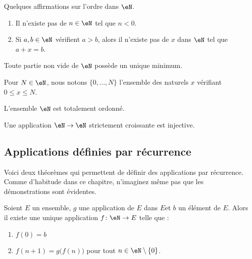 \begin{lemma}       \label{LEMooYMRJooYIAhBb}
    Quelques affirmations sur l'ordre dans \( \eN\).
    \begin{enumerate}
        \item
            Il n'existe pas de \( n\in \eN\) tel que \( n<0\).
        \item
            Si \( a,b\in \eN\) vérifient \( a>b\), alors il n'existe pas de \( x\) dans \( \eN\) tel que \( a+x=b\).
    \end{enumerate}
\end{lemma}

\begin{lemma}       \label{LEMooFHEOooSHPGgU}
    Toute partie non vide de \( \eN\) possède un unique minimum.
\end{lemma}

\begin{definition}      \label{DEFooKBUFooLvMHrf}
    Pour \( N\in \eN\), nous notons \( \{ 0,\ldots, N \}\) l'ensemble des naturels \( x\) vérifiant \( 0\leq x\leq N\).
\end{definition}

\begin{proposition}
    L'ensemble \( \eN\) est totalement ordonné.
\end{proposition}

\begin{proposition}     \label{PROPooFYMJooWihvhk}
    Une application \( \eN\to \eN\) strictement croissante est injective.
\end{proposition}

\subsection{Applications définies par récurrence}

Voici deux théorèmes qui permettent de définir des applications par récurrence. Comme d'habitude dans ce chapitre, n'imaginez même pas que les démonstrations sont évidentes.

\begin{theorem}       \label{THOooEJPYooZFVnez}
    Soient $E$ un ensemble, $g$ une application de $E$ dans $E $et $b$ un élément de $E$.  Alors il existe une unique application \( f\colon \eN\to E\) telle que :
    \begin{enumerate}
        \item
            \( f(0)=b\)
        \item
            \( f(n+1)=g\big( f(n) \big)\) pour tout \( n\in \eN\setminus\{ 0 \}\).
    \end{enumerate}
\end{theorem}

